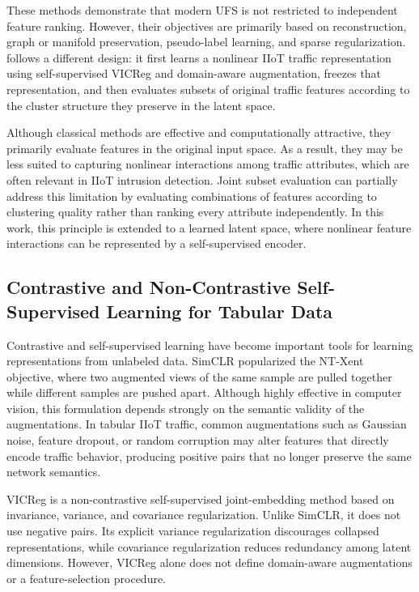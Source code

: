 These methods demonstrate that modern UFS is not restricted to independent feature ranking. However, their objectives are primarily based on reconstruction, graph or manifold preservation, pseudo-label learning, and sparse regularization. \method{} follows a different design: it first learns a nonlinear IIoT traffic representation using self-supervised VICReg and domain-aware augmentation, freezes that representation, and then evaluates subsets of original traffic features according to the cluster structure they preserve in the latent space.

Although classical methods are effective and computationally attractive, they primarily evaluate features in the original input space. As a result, they may be less suited to capturing nonlinear interactions among traffic attributes, which are often relevant in IIoT intrusion detection. Joint subset evaluation can partially address this limitation by evaluating combinations of features according to clustering quality rather than ranking every attribute independently. In this work, this principle is extended to a learned latent space, where nonlinear feature interactions can be represented by a self-supervised encoder.

\subsection{Contrastive and Non-Contrastive Self-Supervised Learning for Tabular Data}

Contrastive and self-supervised learning have become important tools for learning representations from unlabeled data. SimCLR \cite{chen2020simple} popularized the NT-Xent objective, where two augmented views of the same sample are pulled together while different samples are pushed apart. Although highly effective in computer vision, this formulation depends strongly on the semantic validity of the augmentations. In tabular IIoT traffic, common augmentations such as Gaussian noise, feature dropout, or random corruption may alter features that directly encode traffic behavior, producing positive pairs that no longer preserve the same network semantics.

VICReg \cite{bardes2022vicreg} is a non-contrastive self-supervised joint-embedding method based on invariance, variance, and covariance regularization. Unlike SimCLR, it does not use negative pairs. Its explicit variance regularization discourages collapsed representations, while covariance regularization reduces redundancy among latent dimensions. However, VICReg alone does not define domain-aware augmentations or a feature-selection procedure.

